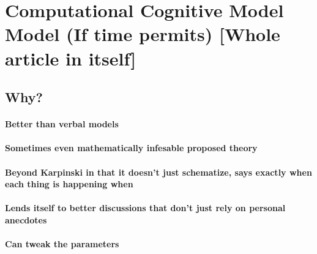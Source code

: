 \documentclass[]{book}
\let\oldparagraph\paragraph
\renewcommand{\paragraph}[1]{\oldparagraph{#1}\mbox{}}
\theoremstyle{definition}
\theoremstyle{definition}
\theoremstyle{definition}
\theoremstyle{remark}
\begin{document}
\hypertarget{computational-cognitive-model-model-if-time-permits-whole-article-in-itself}{%
\section{Computational Cognitive Model Model (If time permits) {[}Whole
article in
itself{]}}\label{computational-cognitive-model-model-if-time-permits-whole-article-in-itself}}

\hypertarget{why-2}{%
\subsection{Why?}\label{why-2}}

\hypertarget{better-than-verbal-models}{%
\paragraph{Better than verbal models}\label{better-than-verbal-models}}

\hypertarget{sometimes-even-mathematically-infesable-proposed-theory}{%
\paragraph{Sometimes even mathematically infesable proposed
theory}\label{sometimes-even-mathematically-infesable-proposed-theory}}

\hypertarget{beyond-karpinski-in-that-it-doesnt-just-schematize-says-exactly-when-each-thing-is-happening-when}{%
\paragraph{Beyond Karpinski in that it doesn't just schematize, says
exactly when each thing is happening
when}\label{beyond-karpinski-in-that-it-doesnt-just-schematize-says-exactly-when-each-thing-is-happening-when}}

\hypertarget{lends-itself-to-better-discussions-that-dont-just-rely-on-personal-anecdotes}{%
\paragraph{Lends itself to better discussions that don't just rely on
personal
anecdotes}\label{lends-itself-to-better-discussions-that-dont-just-rely-on-personal-anecdotes}}

\hypertarget{can-tweak-the-parameters}{%
\paragraph{Can tweak the parameters}\label{can-tweak-the-parameters}}
\end{document}
